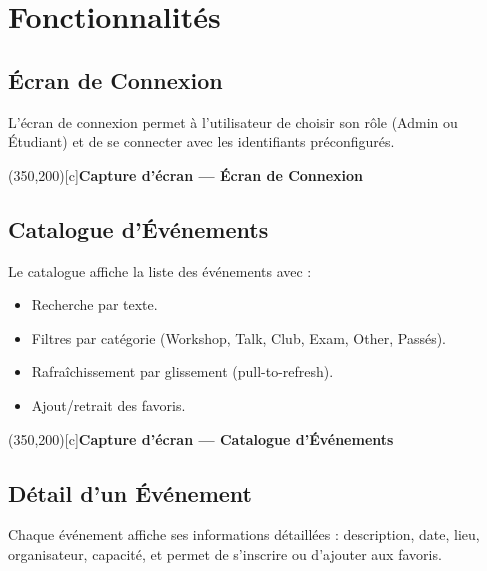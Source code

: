 \documentclass[12pt,a4paper]{article}
\begin{document}
\newpage

\section{Fonctionnalités}

\subsection{Écran de Connexion}

L'écran de connexion permet à l'utilisateur de choisir son rôle (Admin ou Étudiant) et de se connecter avec les identifiants préconfigurés.

\vspace{0.5cm}
\begin{center}
    \framebox(350,200)[c]{\textbf{Capture d'écran --- Écran de Connexion}}
\end{center}
\vspace{0.3cm}

\subsection{Catalogue d'Événements}

Le catalogue affiche la liste des événements avec :
\begin{itemize}
    \item Recherche par texte.
    \item Filtres par catégorie (Workshop, Talk, Club, Exam, Other, Passés).
    \item Rafraîchissement par glissement (pull-to-refresh).
    \item Ajout/retrait des favoris.
\end{itemize}

\vspace{0.5cm}
\begin{center}
    \framebox(350,200)[c]{\textbf{Capture d'écran --- Catalogue d'Événements}}
\end{center}
\vspace{0.3cm}

\subsection{Détail d'un Événement}

Chaque événement affiche ses informations détaillées : description, date, lieu, organisateur, capacité, et permet de s'inscrire ou d'ajouter aux favoris.
\end{document}
